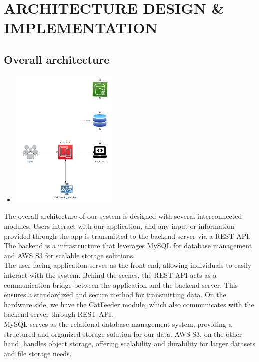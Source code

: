 \documentclass[conference]{IEEEtran}
\begin{document}
\newpage
\section{ARCHITECTURE DESIGN \& IMPLEMENTATION}
\subsection{Overall architecture}
\begin{itemize}
    \item[] \includegraphics[width=0.4\textwidth]{img/Screen/architecture.png}
\end{itemize}
The overall architecture of our system is designed with several interconnected modules. Users interact with our application, and any input or information provided through the app is transmitted to the backend server via a REST API. The backend is a infrastructure that leverages MySQL for database management and AWS S3 for scalable storage solutions.\\

The user-facing application serves as the front end, allowing individuals to easily interact with the system. Behind the scenes, the REST API acts as a communication bridge between the application and the backend server. This ensures a standardized and secure method for transmitting data. On the hardware side, we have the CatFeeder module, which also communicates with the backend server through REST API.\\

MySQL serves as the relational database management system, providing a structured and organized storage solution for our data. AWS S3, on the other hand, handles object storage, offering scalability and durability for larger datasets and file storage needs.

\newpage
\end{document}
